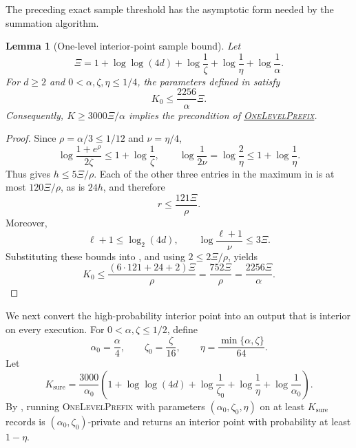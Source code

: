 \documentclass[11pt]{article}
\newtheorem{lemma}{Lemma}[section]
\begin{document}
The preceding exact sample threshold has the asymptotic form needed by the
summation algorithm.

\begin{lemma}[One-level interior-point sample bound]
\label{lem:ip-sample-bound}
Let
\[
 \Xi=1+\log\log(4d)+\log\frac1\zeta
       +\log\frac1\eta+\log\frac1\alpha.
\]
For $d\ge2$ and $0<\alpha,\zeta,\eta\le1/4$, the parameters defined in
satisfy
\[
 K_0\le\frac{2256}{\alpha}\Xi.
\]
Consequently, $K\ge3000\Xi/\alpha$ implies the precondition of
\hyperref[alg:one-level-prefix]{\textsc{OneLevelPrefix}}.
\end{lemma}

\begin{proof}
Since $\rho=\alpha/3\le1/12$ and $\nu=\eta/4$,
\[
 \log\frac{1+e^\rho}{2\zeta}\le1+\log\frac1\zeta,
 \qquad
 \log\frac1{2\nu}=\log\frac2\eta\le1+\log\frac1\eta.
\]
Thus  gives $h\le5\Xi/\rho$.  Each of the
other three entries in the maximum in  is at most
$120\Xi/\rho$, as is $24h$, and therefore
\begin{equation}
 r\le\frac{121\Xi}{\rho}.
 \label{eq:r-comparison}
\end{equation}
Moreover,
\[
 \ell+1\le\log_2(4d),
 \qquad
 \log\frac{\ell+1}{\nu}\le3\Xi.
\]
Substituting these bounds into , and using
$2\le2\Xi/\rho$, yields
\[
 K_0\le\frac{(6\cdot121+24+2)\Xi}{\rho}
 =\frac{752\Xi}{\rho}
 =\frac{2256\Xi}{\alpha}.
\]
\end{proof}

We next convert the high-probability interior point into an output that is
interior on every execution.  For $0<\alpha,\zeta\le1/2$, define
\begin{equation}
 \alpha_0=\frac\alpha4,
 \qquad
 \zeta_0=\frac\zeta{16},
 \qquad
 \eta=\frac{\min\{\alpha,\zeta\}}{64}.
 \label{eq:sure-parameters}
\end{equation}
Let
\begin{equation}
 K_{\mathrm{sure}}
 =\frac{3000}{\alpha_0}\left(
  1+\log\log(4d)+\log\frac1{\zeta_0}
  +\log\frac1\eta+\log\frac1{\alpha_0}
 \right).
 \label{eq:sure-exact-threshold}
\end{equation}
By , running
\textsc{OneLevelPrefix} with parameters
$(\alpha_0,\zeta_0,\eta)$ on at least $K_{\mathrm{sure}}$ records is
$(\alpha_0,\zeta_0)$-private and returns an interior point with probability
at least $1-\eta$.
\end{document}
